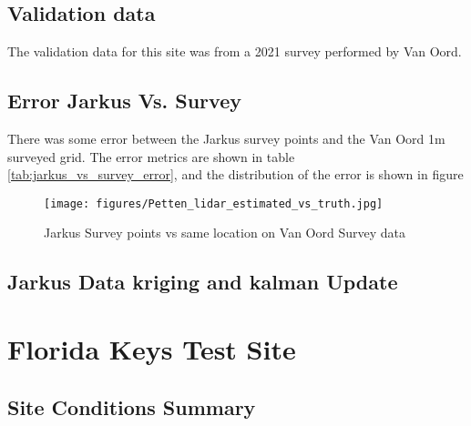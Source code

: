 \subsection{Validation data}
The validation data for this site was from a 2021 survey performed by Van Oord.
\subsection{Error Jarkus Vs. Survey}
There was some error between the Jarkus survey points and the Van Oord 1m surveyed grid. The error metrics are shown in table \ref{tab:jarkus_vs_survey_error}, and the distribution of the error is shown in figure


\begin{figure}[h!]
    \centering
    \texttt{[image: figures/Petten\_lidar\_estimated\_vs\_truth.jpg]}
    \caption{Jarkus Survey points vs same location on Van Oord Survey data}
    \label{fig:jarkus_vs_survey}
\end{figure}

\subsection{Jarkus Data kriging and kalman Update}



\section{Florida Keys Test Site}
\subsection{Site Conditions Summary}


